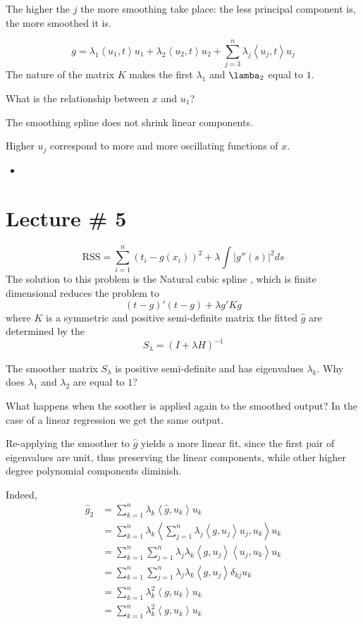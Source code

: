 \documentclass[a4paper]{article}
\newcommand{\brac}[1]{{\left ( #1 \right )}}
\newcommand{\abs}[1]{{\left | #1 \right |}}
\newcommand{\brkt}[1]{{\left\langle #1 \right\rangle}}
\newcommand{\RSS}{{\text{RSS}}}
\begin{document}
The higher the $j$ the more smoothing take place:
	the less principal component is, the more smoothed it is.

\[g = \lambda_1\brkt{u_1, t} u_1 + \lambda_2\brkt{u_2, t} u_2 + \sum_{j=3}^n \lambda_j \brkt{u_j, t} u_j \]
The nature of the matrix $K$ makes the first $\lambda_1$ and $\lamba_2$ equal to $1$.

What is the relationship between $x$ and $u_1$?

The smoothing spline does not shrink linear components.

Higher $u_j$ correspond to more and more oscillating functions of $x$.




\begin{itemize}
	\item
\end{itemize}


\section{Lecture \# 5} %
\label{sec:lecture_5}

\[\RSS = \sum_{i=1}^n \brac{t_i - g(x_i)}^2 + \lambda \int \abs{g''(s)}^2ds\]
The solution to this problem is the Natural cubic spline , which is finite dimensional reduces the problem to
\[\brac{t-g}'\brac{t-g} + \lambda g'K g\]
where $K$ is a symmetric and positive  semi-definite matrix
the fitted $\hat{g}$ are determined by the 
\[S_\lambda = \brac{I+\lambda H}^{-1}\]

The smoother matrix $S_\lambda$ is positive semi-definite and has eigenvalues $\lambda_k$. Why does $\lambda_1$ and $\lambda_2$ are equal to $1$?


What happens when the soother is applied again to the smoothed output?
In the case of a linear regression we get the same output.

Re-applying the smoother to $\hat{g}$ yields a more linear fit, since the first pair of eigenvalues are unit, thus preserving the linear components, while other higher degree polynomial components diminish.

Indeed, \begin{align*}
	\hat{g}_2 & = \sum_{k=1}^n \lambda_k \brkt{\hat{g}, u_k} u_k \\
	& = \sum_{k=1}^n \lambda_k \brkt{\sum_{j=1}^n \lambda_j \brkt{g, u_j} u_j, u_k} u_k \\
	& = \sum_{k=1}^n \sum_{j=1}^n \lambda_j \lambda_k \brkt{g, u_j} \brkt{u_j, u_k} u_k \\
	& = \sum_{k=1}^n \sum_{j=1}^n \lambda_j \lambda_k \brkt{g, u_j} \delta_{kj} u_k \\
	& = \sum_{k=1}^n \lambda_k^2 \brkt{g, u_k} u_k \\
	& = \sum_{k=1}^n \lambda_k^2 \brkt{g, u_k} u_k
\end{align*}
\end{document}
